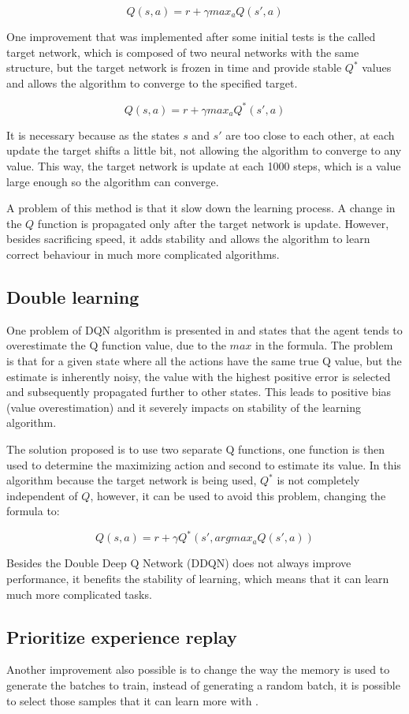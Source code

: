 \documentclass{article}
\newcommand{\targetUpdate}{1000}
\begin{document}
\[Q(s,a)=r+\gamma max_a Q(s',a)\]

One improvement that was implemented after some initial tests is the called target network, which is composed of two neural networks with the same structure, but the target network is frozen in time and provide stable $Q^*$ values and allows the algorithm to converge to the specified target.

\[Q(s,a)=r+\gamma max_a Q^*(s',a)\]

It is necessary because as the states $s$ and $s'$ are too close to each other, at each update the target shifts a little bit, not allowing the algorithm to converge to any value. This way, the target network is update at each \targetUpdate{} steps, which is a value large enough so the algorithm can converge.

A problem of this method is that it slow down the learning process. A change in the $Q$ function is propagated only after the target network is update. However, besides sacrificing speed, it adds stability and allows the algorithm to learn correct behaviour in much more complicated algorithms.

\subsection{Double learning}
One problem of DQN algorithm is presented in \cite{doubleQLearning} and states that the agent tends to overestimate the Q function value, due to the $max$ in the formula. The problem is that for a given state where all the actions have the same true Q value, but the estimate is inherently noisy, the value with the highest positive error is selected and subsequently propagated further to other states. This leads to positive bias (value overestimation) and it severely impacts on stability of the learning algorithm.

The solution proposed is to use two separate Q functions, one function is then used to determine the maximizing action and second to estimate its value. In this algorithm because the target network is being used, $Q^*$ is not completely independent of $Q$, however, it can be used to avoid this problem, changing the formula to:

\[Q(s,a)=r+\gamma Q^*(s', argmax_a Q(s',a))\]

Besides the Double Deep Q Network (DDQN) does not always improve performance, it benefits the stability of learning, which means that it can learn much more complicated tasks.

\subsection{Prioritize experience replay}
Another improvement also possible is to change the way the memory is used to generate the batches to train, instead of generating a random batch, it is possible to select those samples that it can learn more with \cite{prioritizedExperienceReplay}.
\end{document}
